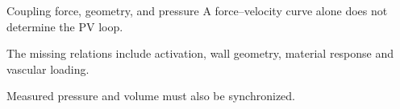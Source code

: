 \documentclass[aspectratio=169,11pt]{beamer}
\newcommand{\notestarget}{notes.pdf}\newcommand{\noteslabel}{Notes}
\begin{document}
\renewcommand{\notestarget}{notes.pdf\#note-coupling-muscle-mechanics-to-chamber-work}
\begin{frame}[t,fragile,label=slide-coupling-force-geometry-and-pressure]{Coupling force, geometry, and pressure}
A force--velocity curve alone does not determine the PV loop.\pause{}\par The missing relations include activation, wall geometry, material response and vascular loading.\pause{}\par Measured pressure and volume must also be synchronized.
\end{frame}
\end{document}
